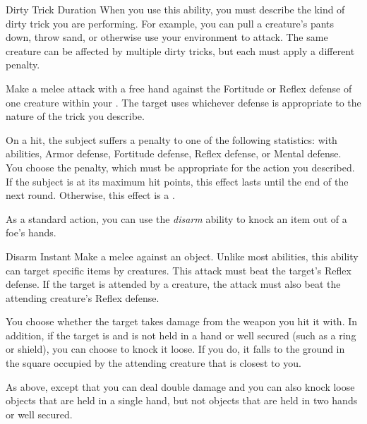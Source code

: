         \begin{durationability}{Dirty Trick}\label{Dirty Trick}
            Duration
            \rankline
            When you use this ability, you must describe the kind of dirty trick you are performing.
            For example, you can pull a creature's pants down, throw sand, or otherwise use your environment to attack.
            The same creature can be affected by multiple dirty tricks, but each must apply a different penalty.

            Make a melee attack with a free hand against the Fortitude or Reflex defense of one creature within your .
            The target uses whichever defense is appropriate to the nature of the trick you describe.

            On a hit, the subject suffers a  penalty to one of the following statistics:
             with  abilities, Armor defense, Fortitude defense, Reflex defense, or Mental defense.
            You choose the penalty, which must be appropriate for the action you described.
            If the subject is at its maximum hit points, this effect lasts until the end of the next round.
            Otherwise, this effect is a .
        \end{durationability}

         As a standard action, you can use the \textit{disarm} ability to knock an item out of a foe's hands.

        \begin{instantability}{Disarm}\label{Disarm}
            Instant
            \rankline
            Make a melee  against an object.
            Unlike most abilities, this ability can target specific items  by creatures.
            This attack must beat the target's Reflex defense.
            If the target is attended by a creature, the attack must also beat the attending creature's Reflex defense.

            \hit You choose whether the target takes damage from the weapon you hit it with.
            In addition, if the target is  and is not held in a hand or well secured (such as a ring or shield), you can choose to knock it loose.
            If you do, it falls to the ground in the square occupied by the attending creature that is closest to you.

            \crit As above, except that you can deal double damage and you can also knock loose objects that are held in a single hand, but not objects that are held in two hands or well secured.
        \end{instantability}

